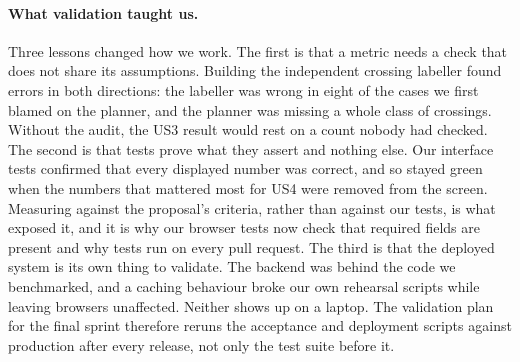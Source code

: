 \paragraph{What validation taught us.}
Three lessons changed how we work. The first is that a metric needs a check
that does not share its assumptions. Building the independent crossing
labeller found errors in both directions: the labeller was wrong in eight of
the cases we first blamed on the planner, and the planner was missing a whole
class of crossings. Without the audit, the US3 result would rest on a count
nobody had checked. The second is that tests prove what they assert and
nothing else. Our interface tests confirmed that every displayed number was
correct, and so stayed green when the numbers that mattered most for US4 were
removed from the screen. Measuring against the proposal's criteria, rather
than against our tests, is what exposed it, and it is why our browser tests now
check that required fields are present and why tests run on every pull request. The third
is that the deployed system is its own thing to validate. The backend was
behind the code we benchmarked, and a caching behaviour broke our own
rehearsal scripts while leaving browsers unaffected. Neither shows up on a
laptop. The validation plan for the final sprint therefore reruns the
acceptance and deployment scripts against production after every release,
not only the test suite before it.
